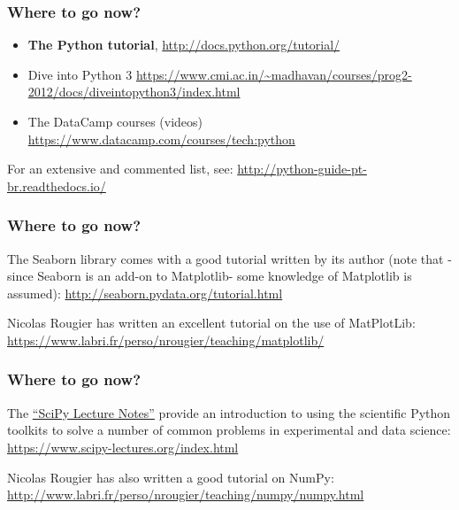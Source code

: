 \documentclass[english,serif,mathserif,xcolor=pdftex,dvipsnames,table]{beamer}
\begin{document}
\begin{frame}[fragile]
  \frametitle{Where to go now?}

  \begin{itemize}
    \item \textbf{The Python tutorial},
      {\small \url{http://docs.python.org/tutorial/}}
    \item {Dive into Python 3}
      {\small \url{https://www.cmi.ac.in/~madhavan/courses/prog2-2012/docs/diveintopython3/index.html}}
    \item {The DataCamp courses (videos)}
      {\small \url{https://www.datacamp.com/courses/tech:python}}
  \end{itemize}

  \+   For an extensive and commented list, see:
  {\url{http://python-guide-pt-br.readthedocs.io/}}
\end{frame}


\begin{frame}
  \frametitle{Where to go now?}

  The Seaborn library comes with a good tutorial written by its author (note
  that -since Seaborn is an add-on to Matplotlib- some knowledge of Matplotlib
  is assumed): \url{http://seaborn.pydata.org/tutorial.html}

  \+
  Nicolas Rougier has written an excellent tutorial on the use of MatPlotLib:
  \url{https://www.labri.fr/perso/nrougier/teaching/matplotlib/}

\end{frame}

\begin{frame}
  \frametitle{Where to go now?}

  The \href{https://www.scipy-lectures.org/index.html}{``SciPy Lecture
    Notes''} provide an introduction to using the scientific Python
  toolkits to solve a number of common problems in experimental and
  data science: \url{https://www.scipy-lectures.org/index.html}

  \+
  Nicolas Rougier has also written a good tutorial on NumPy:
  \url{http://www.labri.fr/perso/nrougier/teaching/numpy/numpy.html}
\end{frame}
\end{document}
